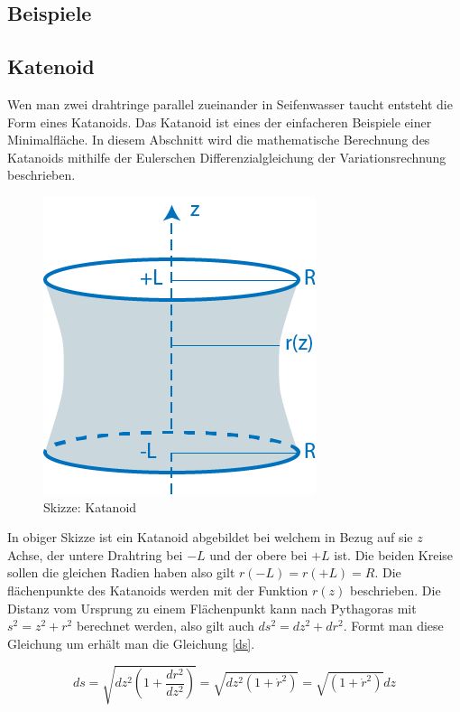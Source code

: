 \begin{refsection}
\section{Beispiele}
\subsection{Katenoid}
Wen man zwei drahtringe parallel zueinander in Seifenwasser taucht entsteht die Form eines Katanoids. 
Das Katanoid ist eines der einfacheren Beispiele einer Minimalfläche. 
In diesem Abschnitt wird die mathematische Berechnung des Katanoids mithilfe der Eulerschen Differenzialgleichung der Variationsrechnung beschrieben.
\begin{figure}[H]
  \centering
  \includegraphics[scale=1]{minimal/soap_film_catanoid.PNG}
  \caption{Skizze: Katanoid} 
\end{figure}
In obiger Skizze ist ein Katanoid abgebildet bei welchem in Bezug auf sie $z$ Achse, der untere Drahtring bei $-L$ und der obere bei $+L$ ist. 
Die beiden Kreise sollen die gleichen Radien haben also gilt $r(-L)=r(+L)=R$. Die flächenpunkte des Katanoids werden mit der Funktion $r(z)$ beschrieben. 
Die Distanz vom Ursprung zu einem Flächenpunkt kann nach Pythagoras mit $s^2=z^2+r^2$ berechnet werden, also gilt auch $ds^2=dz^2+dr^2$.
Formt man diese Gleichung um erhält man die Gleichung \eqref{ds}.

\begin{equation} \label{ds}
  ds=\sqrt{dz^2(1+\frac{dr^2}{dz^2})}= \sqrt{dz^2(1+\dot r^2)}=\sqrt{(1+\dot r^2)}dz
\end{equation}

\end{refsection}
